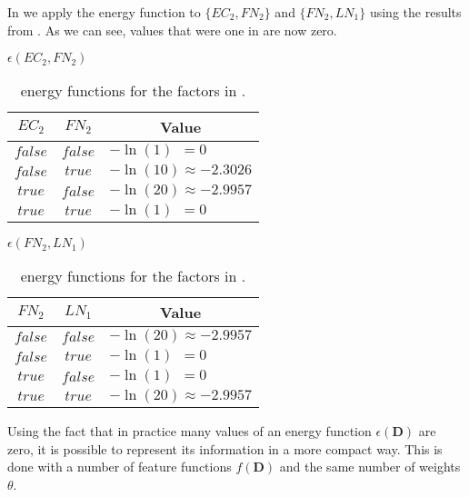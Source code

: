 In  we apply the \gls{energy function} to $\{EC_2,FN_2\}$ and $\{FN_2,LN_1\}$ using the results from .
As we can see, values that were one in  are now zero.

\begin{table}[t]
\begin{minipage}{0.5\linewidth}
\centering
$\epsilon(EC_2,FN_2)$\par
\smallskip
\begin{tabular}{c c l}
 \toprule
  $EC_2$ & $FN_2$ & \multicolumn{1}{c}{Value} \\
 \midrule
 $false$ & $false$ & $-\ln(1)\ \ =0$ \\
 $false$ & $true$ & $-\ln(10)\approx-2.3026$ \\
 $true$ & $false$ & $-\ln(20)\approx-2.9957$ \\
 $true$ & $true$ & $-\ln(1)\ \ =0$ \\
 \bottomrule
\end{tabular}
\end{minipage}
\hfill
\begin{minipage}{0.5\linewidth}
\centering
$\epsilon(FN_2,LN_1)$\par
\smallskip
\begin{tabular}{c c l}
 \toprule
 $FN_2$ & $LN_1$ & \multicolumn{1}{c}{Value} \\
 \midrule
 $false$ & $false$ & $-\ln(20)\approx-2.9957$ \\
 $false$ & $true$ & $-\ln(1)\ \ =0$ \\
 $true$ & $false$ & $-\ln(1)\ \ =0$ \\
 $true$ & $true$ & $-\ln(20)\approx-2.9957$ \\
 \bottomrule
\end{tabular}
\end{minipage}
\caption{\Glspl{energy function} for the \glspl{factor} in .}
\label{tab:example-energy-functions}
\end{table}

\bigskip

Using the fact that in practice many values of an \gls{energy function} $\epsilon(\mathbf{D})$ are zero, it is possible to represent its information in a more compact way.
This is done with a number of \glspl{feature function} $f(\mathbf{D})$ and the same number of weights $\theta$.

